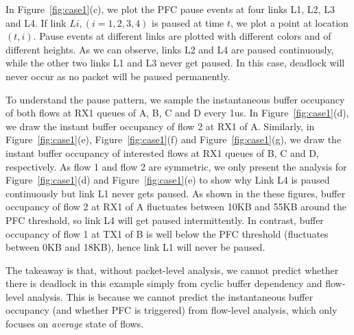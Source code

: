 In Figure~\ref{fig:case1}(c), we plot the PFC pause events at four links L1, L2, L3 and L4. 
If link $Li, (i=1,2,3,4)$ is paused at time $t$, we plot a point at location $(t, i)$. Pause events at 
different links are plotted with different colors and of different heights. As we can observe, links 
L2 and L4 are paused continuously, while the other two links L1 and L3 never get paused. In this case, 
deadlock will never occur as no packet will be paused permanently.

To understand the pause pattern, we sample the instantaneous buffer occupancy of 
both flows at RX1 queues of A, B, C and D every 1us. In Figure~\ref{fig:case1}(d), we draw the instant 
buffer occupancy of flow 2 at RX1 of A. 
Similarly, in Figure~\ref{fig:case1}(e), Figure~\ref{fig:case1}(f) and Figure~\ref{fig:case1}(g), we draw 
the instant buffer occupancy of interested flows at RX1 queues of B, C and D, respectively. As 
flow 1 and flow 2 are symmetric, we only present the analysis for Figure~\ref{fig:case1}(d) and 
Figure~\ref{fig:case1}(e) to show why Link L4 is paused continuously but link L1 never gets paused.
As shown in the these figures, buffer occupancy of flow 2 at RX1 of A fluctuates between 10KB 
and 55KB around the PFC threshold, so link L4 will get paused intermittently. In contrast, buffer 
occupancy of flow 1 at TX1 of B is well below the PFC threshold (fluctuates between 0KB and 18KB), 
hence link L1 will never be paused. 

The takeaway is that, without packet-level analysis, we cannot predict whether there is deadlock in this example
simply from cyclic buffer dependency and flow-level analysis. This is because we cannot predict 
the instantaneous buffer occupancy (and whether PFC is triggered) from flow-level analysis, 
which only focuses on {\em average} state of flows.

%
%



